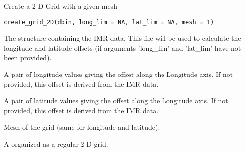 %
\begin{Description}\relax
Create a 2-D Grid with a given mesh
\end{Description}
%
\begin{Usage}
\begin{verbatim}
create_grid_2D(dbin, long_lim = NA, lat_lim = NA, mesh = 1)
\end{verbatim}
\end{Usage}
%
\begin{Arguments}
\begin{ldescription}
\item[\code{dbin}] 
The  structure containing the IMR data. This file
will be used to calculate the longitude and latitude offsets (if arguments
'long\_lim' and 'lat\_lim' have not been provided).

\item[\code{long\_lim}] 
A pair of longitude values giving the offset along the Longitude axis.
If not provided, this offset is derived from the IMR data.

\item[\code{lat\_lim}] 
A pair of latitude values giving the offset along the Longitude axis.
If not provided, this offset is derived from the IMR data.

\item[\code{mesh}] 
Mesh of the grid (same for longitude and latitude).

\end{ldescription}
\end{Arguments}
%
\begin{Value}
A  organized as a regular 2-D grid.
\end{Value}
